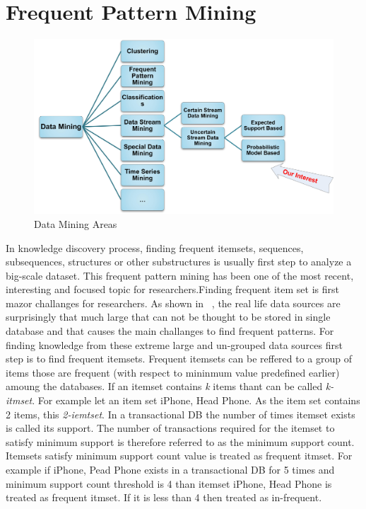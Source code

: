 \section{Frequent Pattern Mining}
\begin{figure}
\centering
  \includegraphics[width=.9\textwidth]{images/mining_class.jpg}
\caption{Data Mining Areas}
\label{figure:mining_class}
\end{figure}
In knowledge discovery process, finding frequent itemsets, sequences, subsequences, structures or other substructures is usually first step to analyze a big-scale dataset. This frequent pattern mining has been one of the most recent, interesting and focused topic for  researchers.Finding frequent item set is first mazor challanges for researchers. As shown in ~\cite{apriori}, the real life data sources are surprisingly that much large that can not be thought to be stored in single database and that causes the main challanges to find frequent patterns. For finding knowledge from these extreme large and un-grouped data sources first step is to find frequent itemsets. Frequent itemsets can be reffered to a group of items those are frequent (with respect to mininmum value predefined earlier) amoung the databases. If an itemset contains \emph{k} items thant can be called \emph{k-itmset}. For example let an item set {iPhone, Head Phone}. As the item set contains 2 items, this \emph{2-iemtset}. In a transactional DB the number of times itemset exists is called its support. The number of transactions required for the itemset to satisfy minimum support is therefore referred to as the minimum support count. Itemsets satisfy minimum support count value is treated as frequent itmset. For example if {iPhone, Pead Phone} exists in a transactional DB for 5 times and minimum support count threshold is 4 than itemset {iPhone, Head Phone} is treated as frequent itmset. If it is less than 4 then treated as  in-frequent.\\
